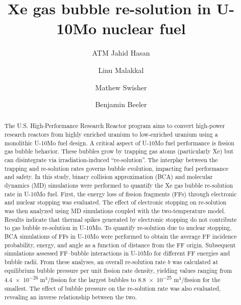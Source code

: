 \documentclass[review]{elsarticle}
\begin{document}
\begin{frontmatter}

\title{Xe gas bubble re-solution in U-10Mo nuclear fuel}

\author[ncsu]{ATM Jahid Hasan}
\author[inl]{Linu Malakkal}
\author[inl]{Mathew Swisher}
\author[ncsu,inl]{Benjamin Beeler}

\address[ncsu]{Department of Nuclear Engineering, North Carolina State
University, Raleigh, NC 27695, United States}
\address[inl]{Idaho National Laboratory, Idaho Falls, ID 83415, United States}

\begin{abstract}
	The U.S. High-Performance Research Reactor program
	aims to convert high-power research reactors
	from highly enriched uranium to low-enriched uranium
	using a monolithic U-10Mo fuel design.
	A critical aspect of U-10Mo fuel performance is fission gas bubble behavior.
	These bubbles grow by trapping gas atoms (particularly Xe)
	but can disintegrate via irradiation-induced ``re-solution''.
	The interplay between the trapping and re-solution rates
	governs bubble evolution, impacting fuel performance and safety.
	In this study,
	binary collision approximation (BCA) and molecular dynamics (MD) simulations
	were performed to quantify the Xe gas bubble re-solution rate in U-10Mo fuel.
	First, the energy loss of fission fragments (FFs)
	through electronic and nuclear stopping was evaluated.
	The effect of electronic stopping on re-solution was then analyzed
	using MD simulations coupled with the two-temperature model.
	Results indicate that thermal spikes generated by electronic stopping
	do not contribute to gas bubble re-solution in U-10Mo.
	To quantify re-solution due to nuclear stopping,
	BCA simulations of FFs in U-10Mo were performed
	to obtain the average FF incidence probability, energy, and angle
	as a function of distance from the FF origin.
	Subsequent simulations assessed FF--bubble interactions in U-10Mo
	for different FF energies and bubble radii.
	From these analyses,
	an overall re-solution rate $b$ was calculated
	at equilibrium bubble pressure per unit fission rate density,
	yielding values ranging
	from \num{4.4e-26} m$^3$/fission for the largest bubbles
	to \num{8.8e-25} m$^3$/fission for the smallest.
	The effect of bubble pressure on the re-solution rate was also evaluated,
	revealing an inverse relationship between the two.
\end{abstract}

\end{frontmatter}
\end{document}
